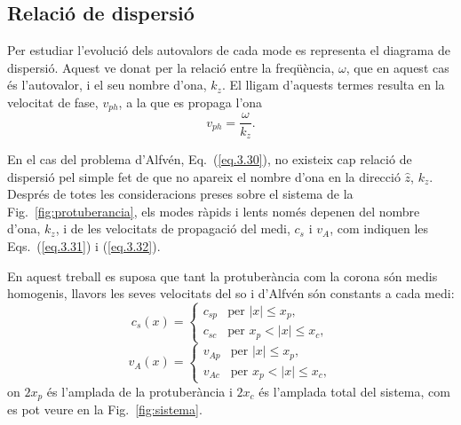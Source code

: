 \subsection{Relació de dispersió}
Per estudiar l'evolució dels autovalors de cada mode es representa el diagrama de dispersió.
Aquest ve donat per la relació entre la freqüència, $\omega$, que en aquest cas és l'autovalor, i el seu nombre d'ona, $k_z$.
El lligam d'aquests termes resulta en la velocitat de fase, $v_{ph}$, a la que es propaga l'ona
\begin{equation}
	{v}_{ph} = \frac{\omega}{k_z}. \tag{3.33} \label{eq.3.33}
\end{equation}
%
%

En el cas del problema d'Alfvén, Eq.~(\ref{eq.3.30}), no existeix cap relació de dispersió pel simple fet de que no apareix el nombre d'ona en la direcció $\hat{z}$, $k_z$.
Després de totes les consideracions preses sobre el sistema de la Fig.~\ref{fig:protuberancia},
els modes ràpids i lents només depenen del nombre d'ona, $k_z$, i de les velocitats de propagació del medi, $c_s$ i $v_A$,
com indiquen les Eqs.~(\ref{eq.3.31}) i (\ref{eq.3.32}).

En aquest treball es suposa que tant la protuberància com la corona són medis homogenis,
llavors les seves velocitats del so i d'Alfvén són constants a cada medi:
\begin{equation}
c_s(x) = 
\begin{cases}
c_{s p} & \text{per } |x| \leq x_p, \\
c_{s c} & \text{per } x_p < |x| \leq x_c,
\end{cases} \tag{3.34} \label{eq.3.34}
\end{equation}
\begin{equation}
v_A(x) = 
\begin{cases}
v_{A p} & \text{per } |x| \leq x_p, \\
v_{A c} & \text{per } x_p < |x| \leq x_c,
\end{cases} \tag{3.35} \label{eq.3.35}
\end{equation}
on $2x_p$ és l'amplada de la protuberància i $2x_c$ és l'amplada total del sistema, com es pot veure en la Fig.~\ref{fig:sistema}.

%
% 
% 
% 
%
